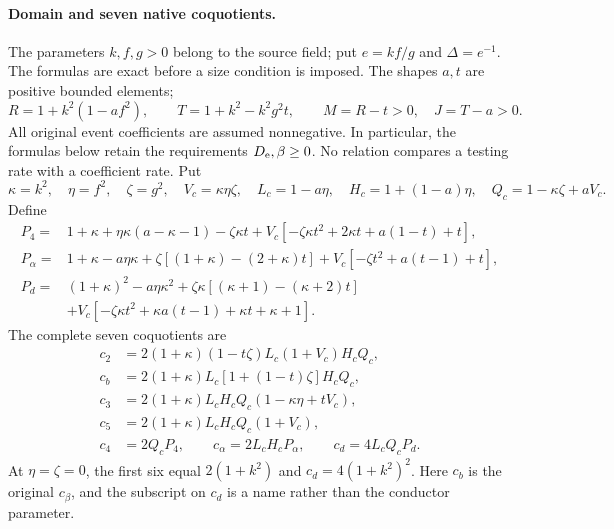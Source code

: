 \paragraph{Domain and seven native coquotients.}
The parameters $k,f,g>0$ belong to the source field; put $e=kf/g$ and $\Delta=e^{-1}$. The formulas are exact before a size condition is imposed. The shapes $a,t$ are positive bounded elements;
\[
 R=1+k^2(1-af^2),\qquad T=1+k^2-k^2g^2t,
 \qquad M=R-t>0,\quad J=T-a>0.
\]
All original event coefficients are assumed nonnegative. In particular,
the formulas below retain the requirements $D_{\rm e},\beta\ge0$.
No relation compares a testing rate with a coefficient rate.
Put
\[
 \kappa=k^2,\quad \eta=f^2,\quad \zeta=g^2,
 \quad V_c=\kappa\eta\zeta,\quad
 L_c=1-a\eta,\quad H_c=1+(1-a)\eta,\quad Q_c=1-\kappa\zeta+aV_c.
\]
Define
\begin{align*}
P_4={}&1+\kappa+\eta\kappa(a-\kappa-1)-\zeta\kappa t
 +V_c[-\zeta\kappa t^2+2\kappa t+a(1-t)+t],\\
P_\alpha={}&1+\kappa-a\eta\kappa
 +\zeta[(1+\kappa)-(2+\kappa)t]
 +V_c[-\zeta t^2+a(t-1)+t],\\
P_d={}&(1+\kappa)^2-a\eta\kappa^2
 +\zeta\kappa[(\kappa+1)-(\kappa+2)t]\\
 &+V_c[-\zeta\kappa t^2+\kappa a(t-1)+\kappa t+\kappa+1].
\end{align*}
The complete seven coquotients are
\begin{align*}
c_2&=2(1+\kappa)(1-t\zeta)L_c(1+V_c)H_cQ_c,\\
c_b&=2(1+\kappa)L_c[1+(1-t)\zeta]H_cQ_c,\\
c_3&=2(1+\kappa)L_cH_cQ_c(1-\kappa\eta+tV_c),\\
c_5&=2(1+\kappa)L_cH_cQ_c(1+V_c),\\
c_4&=2Q_cP_4,\qquad c_\alpha=2L_cH_cP_\alpha,
 \qquad c_d=4L_cQ_cP_d.
\end{align*}
At $\eta=\zeta=0$, the first six equal $2(1+k^2)$ and $c_d=4(1+k^2)^2$.
Here $c_b$ is the original $c_\beta$, and the subscript on $c_d$ is a
name rather than the conductor parameter.

